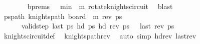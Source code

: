 \begin{isabellebody}
\ \ \ \ \ \ \isamarkupfalse%
\ b{\isacharunderscore}{\kern0pt}prems\ {\isacartoucheopen}{}\ {\isasymle}\ min\ {}\ {\isacharparenleft}{\kern0pt}m{\isacharminus}{\kern0pt}{}{\isacharparenright}{\kern0pt}{\isacartoucheclose}\ rotate{\isacharunderscore}{\kern0pt}knights{\isacharunderscore}{\kern0pt}circuit\ \isamarkupfalse%
\ blast\isanewline
\ \ \ \ \isamarkupfalse%
\ \isamarkupfalse%
\ pspath{\isacharcolon}{\kern0pt}\ {\isachardoublequoteopen}knights{\isacharunderscore}{\kern0pt}path\ {\isacharparenleft}{\kern0pt}board\ {}\ {\isacharparenleft}{\kern0pt}m{\isacharminus}{\kern0pt}{}{\isacharparenright}{\kern0pt}{\isacharparenright}{\kern0pt}\ {\isacharparenleft}{\kern0pt}rev\ ps\ \isanewline
\ \ \ \ \ \ {\isachardoublequoteopen}valid{\isacharunderscore}{\kern0pt}step\ {\isacharparenleft}{\kern0pt}last\ ps\ {\isacharparenleft}{\kern0pt}hd\ ps\ {\isachardoublequoteopen}hd\ {\isacharparenleft}{\kern0pt}rev\ ps\ {\isacharequal}{\kern0pt}\ {\isacharparenleft}{\kern0pt}{}{\isacharcomma}{\kern0pt}{}{\isacharparenright}{\kern0pt}{\isachardoublequoteclose}\ {\isachardoublequoteopen}last\ {\isacharparenleft}{\kern0pt}rev\ ps\ {\isacharequal}{\kern0pt}\ {\isacharparenleft}{\kern0pt}{}{\isacharcomma}{\kern0pt}{}{\isacharparenright}{\kern0pt}{\isachardoublequoteclose}\isanewline
\ \ \ \ \ \ \isamarkupfalse%
\ knights{\isacharunderscore}{\kern0pt}circuit{\isacharunderscore}{\kern0pt}def\ \isamarkupfalse%
\ knights{\isacharunderscore}{\kern0pt}path{\isacharunderscore}{\kern0pt}rev\ \isamarkupfalse%
\ {\isacharparenleft}{\kern0pt}auto\ simp{\isacharcolon}{\kern0pt}\ hd{\isacharunderscore}{\kern0pt}rev\ last{\isacharunderscore}{\kern0pt}rev{\isacharparenright}{\kern0pt}\isanewline
\isanewline
\ \ \ \ \isamarkupfalse%

\end{isabellebody}
